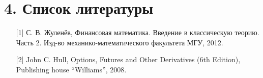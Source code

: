 \documentclass[12pt,a4 paper]{book}
\begin{document}
\newpage
\section*{4. Список литературы}
\smallskip
\begin{enumerate}
\item[{[1]}] С. В. Жуленёв, Финансовая математика. Введение в классическую теорию. Часть 2. Изд-во механико-математического факультета МГУ, 2012.
\item[{[2]}] John C. Hull, Options, Futures and Other Derivatives (6th Edition), Publishing house “Williams”, 2008.
\end{enumerate}
\end{document}

